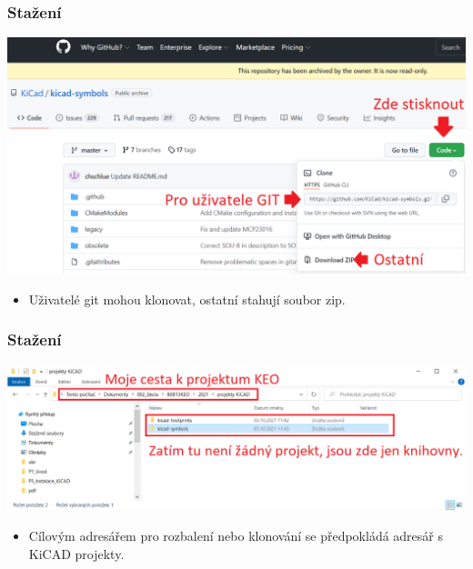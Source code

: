\documentclass{beamer}
\begin{document}
	\begin{frame}
    \frametitle{Stažení}

    \begin{center}
			\includegraphics[scale=0.3]{obr/github_lib2.png}
		\end{center}
		
		\begin{itemize}
			\item Uživatelé git mohou klonovat, ostatní stahují soubor zip.
		\end{itemize}
		
	\end{frame}
	\begin{frame}
    \frametitle{Stažení}

    \begin{center}
			\includegraphics[scale=0.35]{obr/proj_lib1.png}
		\end{center}
	
		\begin{itemize}
			\item Cílovým adresářem pro rozbalení nebo klonování se předpokládá adresář s KiCAD projekty.
		\end{itemize}
		
	\end{frame}
\end{document}
